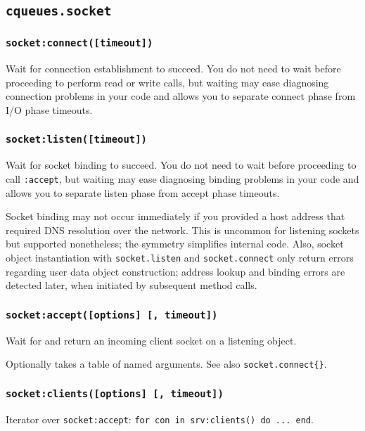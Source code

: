 \documentclass[11pt, oneside]{memoir}
\newcommand*{\fn}[1]{\texttt{#1}\xspace}
\newcommand*{\method}[1]{\texttt{#1}\xspace}
\newcounter{toccols}
\newenvironment{Module}[1]{
	\subsection{\texttt{#1}}
	\addtocontents{toc}{
		\protect\begin{multicols}{\value{toccols}}
	}
}{
	\addtocontents{toc}{\protect\end{multicols}}
}
\begin{document}
\begin{Module}{cqueues.socket}
\subsubsection[\fn{socket:connect}]{\fn{socket:connect([timeout])}}
Wait for connection establishment to succeed. You do not need to wait before proceeding to perform
read or write calls, but waiting may ease diagnosing connection problems in your code and allows you to separate connect phase from I/O phase timeouts.

\subsubsection[\fn{socket:listen}]{\fn{socket:listen([timeout])}}
Wait for socket binding to succeed. You do not need to wait before proceeding to call \fn{:accept}, but waiting may ease diagnosing binding problems in your code and allows you to separate listen phase from accept phase timeouts.

Socket binding may not occur immediately if you provided a host address that required DNS resolution over the network. This is uncommon for listening sockets but supported nonetheless; the symmetry simplifies internal code. Also, socket object instantiation with \fn{socket.listen} and \fn{socket.connect} only return errors regarding user data object construction; address lookup and binding errors are detected later, when initiated by subsequent method calls.

\subsubsection[\fn{socket:accept}]{\fn{socket:accept([options] [, timeout])}}
Wait for and return an incoming client socket on a listening object.

Optionally takes a table of named arguments. See also \fn{socket.connect\{\}}.

\subsubsection[\fn{socket:clients}]{\fn{socket:clients([options] [, timeout])}}
Iterator over \method{socket:accept}: \texttt{for con in srv:clients() do ... end}.



\end{Module}
\end{document}
